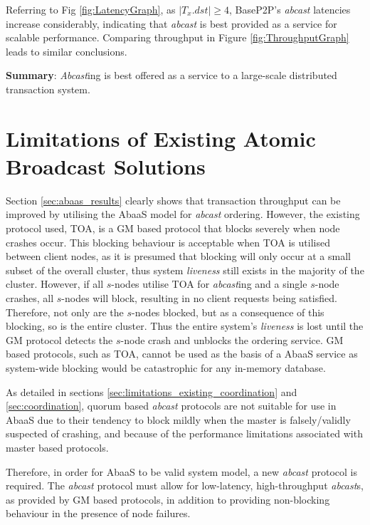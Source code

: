 Referring to Fig \ref{fig:LatencyGraph}, as $|T_x.dst| \geq 4$, BaseP2P's \emph{abcast} latencies increase considerably, indicating that \emph{abcast} is best provided as a service for scalable performance. Comparing throughput in Figure \ref{fig:ThroughputGraph} leads to similar conclusions.

\noindent \textbf{Summary}: \emph{Abcast}ing is best offered as a service to a large-scale distributed transaction system. 

\section{Limitations of Existing Atomic Broadcast Solutions}
Section \ref{sec:abaas_results} clearly shows that transaction throughput can be improved by utilising the \textsf{AbaaS} model for \emph{abcast} ordering.  However, the existing protocol used, TOA, is a GM based protocol that blocks severely when node crashes occur.  This blocking behaviour is acceptable when TOA is utilised between client nodes, as it is presumed that blocking will only occur at a small subset of the overall cluster, thus system \emph{liveness} still exists in the majority of the cluster.  However, if all $s$-nodes utilise TOA for \emph{abcast}ing and a single $s$-node crashes, all $s$-nodes will block, resulting in no client requests being satisfied. Therefore, not only are the $s$-nodes blocked, but as a consequence of this blocking, so is the entire cluster.  Thus the entire system's \emph{liveness} is lost until the GM protocol detects the $s$-node crash and unblocks the ordering service.  GM based protocols, such as TOA, cannot be used as the basis of a \textsf{AbaaS} service as system-wide blocking would be catastrophic for any in-memory database.  

As detailed in sections \ref{sec:limitations_existing_coordination} and \ref{sec:coordination}, quorum based \emph{abcast} protocols are not suitable for use in \textsf{AbaaS} due to their tendency to block mildly when the master is falsely/validly suspected of crashing, and because of the performance limitations associated with master based protocols.  

Therefore, in order for \textsf{AbaaS} to be valid system model, a new \emph{abcast} protocol is required.  The \emph{abcast} protocol must allow for low-latency, high-throughput \emph{abcast}s, as provided by GM based protocols, in addition to providing non-blocking behaviour in the presence of node failures.  